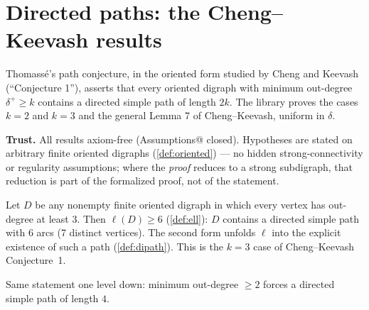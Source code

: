 \chapter{Directed paths: the Cheng--Keevash results}
\label{ch:paths}

Thomass\'e's path conjecture, in the oriented form studied by Cheng
and Keevash (``Conjecture 1''), asserts that every oriented digraph
with minimum out-degree $\delta^+ \ge k$ contains a directed simple
path of length $2k$. The library proves the cases $k = 2$ and $k = 3$
and the general Lemma 7 of Cheng--Keevash, uniform in $\delta$.

\begin{trustbox}
\noindent\textbf{Trust.} All results axiom-free
(\rocqinline@Print Assumptions@ closed). Hypotheses are stated on
arbitrary finite oriented digraphs (\cref{def:oriented}) --- no
hidden strong-connectivity or regularity assumptions; where the
\emph{proof} reduces to a strong subdigraph, that reduction is part of
the formalized proof, not of the statement.
\end{trustbox}




\label{res:ck_conj1_delta3_path}

\begin{decoded}
Let $D$ be any nonempty finite oriented digraph in which every vertex
has out-degree at least $3$. Then $\ell(D) \ge 6$
(\cref{def:ell}): $D$ contains a directed simple path with $6$ arcs
(7 distinct vertices). The second form unfolds $\ell$ into the
explicit existence of such a path (\cref{def:dipath}).
This is the $k = 3$ case of Cheng--Keevash Conjecture~1.
\end{decoded}






\begin{decoded}
Same statement one level down: minimum out-degree $\ge 2$ forces a
directed simple path of length $4$.
\end{decoded}





